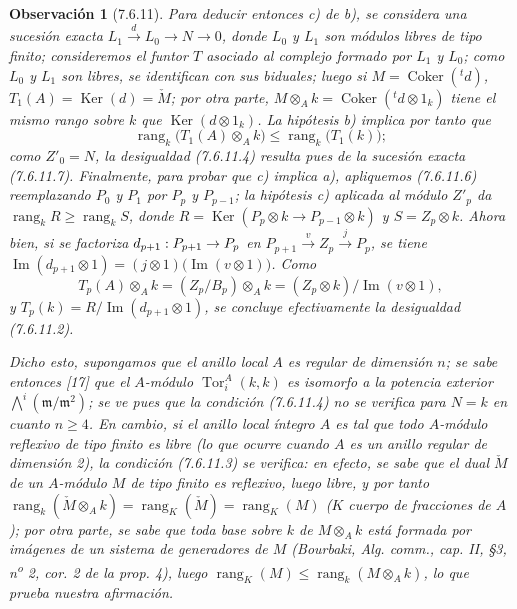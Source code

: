 \documentclass[10pt,oneside,openany]{book}
\theoremstyle{egaenv}\newtheorem*{env}{---}
\theoremstyle{egastatement}
\theoremstyle{egadescription}
\newtheorem*{remark}{Observación}
\renewcommand{\leq}{\leqslant}
\renewcommand{\geq}{\geqslant}
\renewcommand{\to}{\mathchoice{\longrightarrow}{\rightarrow}{\rightarrow}{\rightarrow}}
\begin{document}
\begin{remark}[7.6.11]
Para deducir entonces \emph{c)} de \emph{b)}, se considera una sucesión exacta
$L_1\xrightarrow{d}L_0\longrightarrow N\longrightarrow0$,
donde $L_0$ y $L_1$ son módulos libres de tipo finito; consideremos el funtor
$T$ asociado al complejo formado por $L_1$ y $L_0$; como $L_0$ y $L_1$ son
libres, se identifican con sus biduales; luego si
$M=\operatorname{Coker}({}^t d)$, $T_1(A)=\operatorname{Ker}(d)=\check M$;
por otra parte, $M\otimes_A k=\operatorname{Coker}({}^t d\otimes1_k)$ tiene el mismo rango
sobre $k$ que $\operatorname{Ker}(d\otimes1_k)$. La hipótesis \emph{b)} implica por tanto
que
\[
  \operatorname{rang}_k\bigl(T_1(A)\otimes_A k\bigr)
  \leq
  \operatorname{rang}_k\bigl(T_1(k)\bigr);
\]
como $Z'_0=N$, la desigualdad (7.6.11.4) resulta pues de la sucesión exacta
(7.6.11.7).
Finalmente, para probar que \emph{c)} implica \emph{a)}, apliquemos (7.6.11.6) reemplazando
$P_0$ y $P_1$ por $P_p$ y $P_{p-1}$; la hipótesis \emph{c)} aplicada al módulo
$Z'_p$ da $\operatorname{rang}_kR\geq\operatorname{rang}_kS$, donde
$R=\operatorname{Ker}(P_p\otimes k\longrightarrow P_{p-1}\otimes k)$ y $S=Z_p\otimes k$.
Ahora bien, si se factoriza $d_{p+1}:P_{p+1}\to P_p$ en
$P_{p+1}\xrightarrow{v}Z_p\xrightarrow{j}P_p$,
se tiene
$\operatorname{Im}(d_{p+1}\otimes1)=(j\otimes1)\bigl(\operatorname{Im}(v\otimes1)\bigr)$.
Como
\[
  T_p(A)\otimes_A k
  =(Z_p/B_p)\otimes_A k
  =(Z_p\otimes k)/\operatorname{Im}(v\otimes1),
\]
y
$T_p(k)=R/\operatorname{Im}(d_{p+1}\otimes1)$,
se concluye efectivamente la desigualdad (7.6.11.2).

Dicho esto, supongamos que el anillo local $A$ es \emph{regular} de dimensión $n$;
se sabe entonces [17] que el $A$-módulo
$\operatorname{Tor}_i^A(k,k)$ es isomorfo a la potencia exterior
$\bigwedge\nolimits^i(\mathfrak m/\mathfrak m^2)$;
se ve pues que la condición (7.6.11.4) no se verifica para $N=k$ en cuanto
$n\geq4$.
En cambio, si el anillo local íntegro $A$ es tal que todo $A$-módulo \emph{reflexivo}
de tipo finito es \emph{libre} (lo que ocurre cuando $A$ es un anillo regular
de dimensión 2), la condición (7.6.11.3) se verifica: en efecto, se sabe que el
dual $\check M$ de un $A$-módulo $M$ de tipo finito es reflexivo, luego libre, y
por tanto
$\operatorname{rang}_k(\check M\otimes_A k)=\operatorname{rang}_K(\check M)=\operatorname{rang}_K(M)$
($K$ cuerpo de fracciones de $A$); por otra parte, se sabe que toda base sobre $k$
de $M\otimes_A k$ está formada por imágenes de un sistema de generadores de $M$
(Bourbaki, \emph{Alg. comm.}, cap. II, \S 3, n\textsuperscript{o} 2, cor. 2 de
la prop. 4), luego
$\operatorname{rang}_K(M)\leq\operatorname{rang}_k(M\otimes_A k)$, lo que
prueba nuestra afirmación.
\end{remark}
\end{document}
